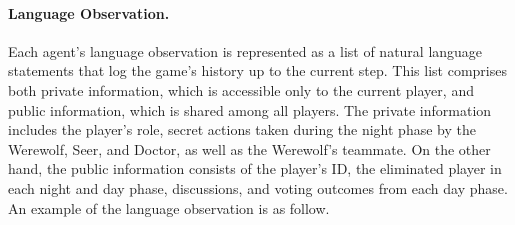 \paragraph{Language Observation.}
Each agent's language observation is represented as a list of natural language statements that log the game's history up to the current step. This list comprises both private information, which is accessible only to the current player, and public information, which is shared among all players. The private information includes the player's role, secret actions taken during the night phase by the Werewolf, Seer, and Doctor, as well as the Werewolf's teammate. On the other hand, the public information consists of the player's ID, the eliminated player in each night and day phase, discussions, and voting outcomes from each day phase. An example of the language observation is as follow.

